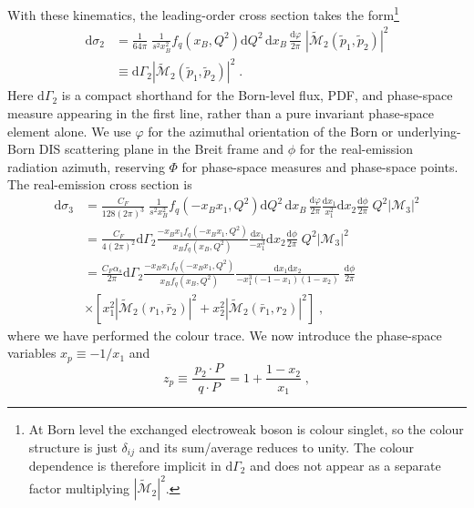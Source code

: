 \documentclass[a4paper,11pt]{article}
\newcommand{\ldot}[2]  {\:{#1}\!\cdot\!{#2}\:}
\begin{document}
With these kinematics, the leading-order cross section takes the form\footnote{At Born level the exchanged electroweak boson is colour singlet, so the colour structure is just $\delta_{ij}$ and its sum/average reduces to unity. The colour dependence is therefore implicit in $\mathrm{d}\Gamma_2$ and does not appear as a separate factor multiplying $|\widetilde{\mathcal{M}}_2|^2$.}
\begin{align}
  \mathrm{d} \sigma_2 &= \frac{1}{64\pi}\;\frac{1}{s^2 x_B^2}f_q(x_B,Q^2)
    \mathrm{d} Q^2\, \mathrm{d} x_B\, \frac{\mathrm{d}\varphi}{2\pi}\; |\widetilde{\mathcal{M}}_2(\tilde{p}_1,\tilde{p}_2)|^2 \\
  &\equiv \mathrm{d} \Gamma_2 |\widetilde{\mathcal{M}}_2(\tilde{p}_1,\tilde{p}_2)|^2\;.
\end{align}
Here $\mathrm{d}\Gamma_2$ is a compact shorthand for the Born-level flux, PDF, and phase-space measure appearing in the first line, rather than a pure invariant phase-space element alone. We use $\varphi$ for the azimuthal orientation of the Born or underlying-Born DIS scattering plane in the Breit frame and $\phi$ for the real-emission radiation azimuth, reserving $\Phi$ for phase-space measures and phase-space points.
The real-emission cross section is
\begin{align}
  \mathrm{d}\sigma_3 &= \frac{C_F}{128(2\pi)^3}\;\frac{1}{s^2x_B^2}
    f_q(-x_B x_1,Q^2)
    \mathrm{d} Q^2\, \mathrm{d} x_B\,\frac{\mathrm{d}\varphi}{2\pi}\frac{\mathrm{d} x_1}{x_1^2}\mathrm{d}x_2\frac{\mathrm{d} \phi}{2\pi}\;
    Q^2 |\mathcal{M}_3|^2 \\
  &= \frac{C_F}{4(2\pi)^2}\mathrm{d}\Gamma_2
    \frac{-x_B x_1f_q(-x_B x_1,Q^2)}
         { x_B    f_q( x_B    ,Q^2)}
    \frac{\mathrm{d} x_1}{-x_1^3}\mathrm{d}x_2
    \frac{\mathrm{d}\phi}{2\pi}\;
    Q^2 |\mathcal{M}_3|^2 \\
  &= \frac{C_F\alpha_s}{2\pi}\mathrm{d}\Gamma_2
    \frac{-x_B x_1f_q(-x_B x_1,Q^2)}
         { x_B    f_q( x_B    ,Q^2)}
    \frac{\mathrm{d} x_1 \mathrm{d}x_2}{-x_1^3(-1-x_1)(1-x_2)}\;\frac{\mathrm{d}\phi}{2\pi}
\nonumber\\&
   \times \left[ x_1^2|\widetilde{\mathcal{M}}_2(r_1,\bar{r}_2)|^2 +
           x_2^2|\widetilde{\mathcal{M}}_2(\bar{r}_1,r_2)|^2 \right]\;,
\label{eq:QCDC1}
\end{align}
where we have performed the colour trace. We now introduce the phase-space variables $x_p \equiv -1/x_1$ and
\begin{equation}
z_p \equiv \frac{\ldot{p_2}{P}}{\ldot{q}{P}} = 1 + \frac{1-x_2}{x_1}\;,
\end{equation}
\end{document}
